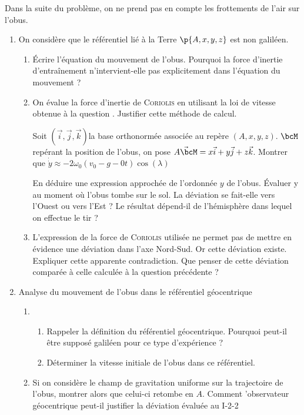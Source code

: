 \documentclass[a4paper,french,bookmarks]{article}
\begin{document}
    Dans la suite du problème, on ne prend pas en compte les frottements de l'air sur l'obus.
    \begin{enumerate}[resume]
        \item On considère que le référentiel lié à la Terre $\p{A, x, y
        , z}$ est non galiléen.

        \begin{enumerate}
            \item Écrire l'équation du mouvement de l'obus. Pourquoi la force
            d'inertie d'entraînement n'intervient-elle pas explicitement dans
            l'équation du mouvement ?
            
            \item On évalue la force d'inertie de \textsc{Coriolis} en utilisant la loi de vitesse obtenue à la question .
            Justifier cette méthode de calcul.

            Soit \(\left(\vec i, \vec j, \vec k\right)\)la base orthonormée associée au repère \(\left(A,x,y,z\right)\). \(\bcM\) repérant la position de l'obus, on pose \(\vec{A\bcM}=x\vec i + y\vec j + z\vec k\). Montrer que \(\dot{\dot{y}} \approx -2\omega_0\left(v_0 - g-0t\right)\cos(\lambda)\)

            En déduire une expression approchée de l'ordonnée $y$ de l'obus. Évaluer y au moment où l'obus tombe sur le sol. La déviation se fait-elle vers l'Ouest ou vers l'Est ? Le résultat dépend-il de l'hémisphère dans lequel on effectue le tir ?

            \item L'expression de la force de \textsc{Coriolis} utilisée ne permet pas de mettre en évidence une déviation dans l'axe Nord-Sud. Or cette déviation existe. Expliquer cette apparente contradiction. Que penser de cette déviation comparée à celle calculée à la question précédente ?
            
        \end{enumerate}

        \item Analyse du mouvement de l'obus dans le référentiel géocentrique

        \begin{enumerate}
            \item 
            \begin{enumerate}
                \item Rappeler la définition du référentiel géocentrique. Pourquoi peut-il être supposé galiléen pour ce type d'expérience ? 

                \item Déterminer la vitesse initiale de l'obus dans ce référentiel.
            \end{enumerate}
            \item Si on considère le champ de gravitation uniforme sur la trajectoire de l'obus, montrer alors que celui-ci retombe en $A$. Comment 'observateur géocentrique peut-il justifier la déviation évaluée au I-2-2
        \end{enumerate}
    \end{enumerate}
    
\end{document}

